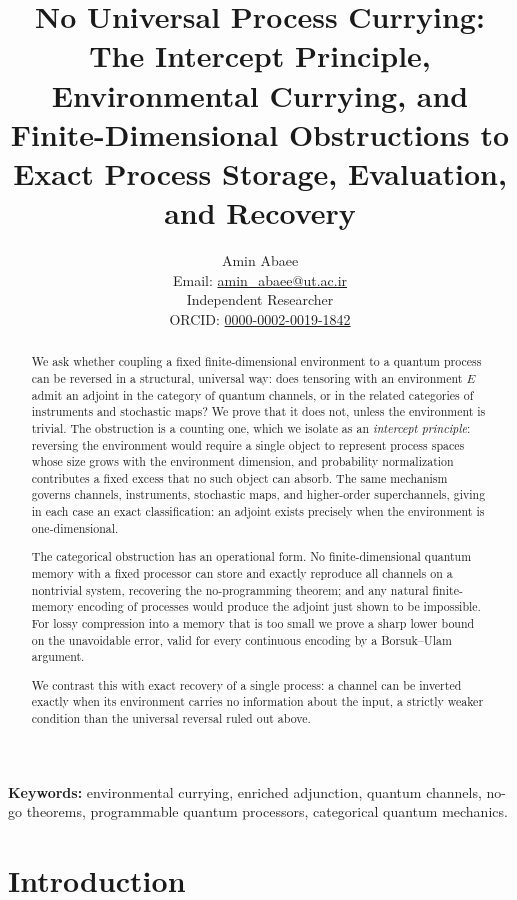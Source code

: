 \documentclass[11pt]{article}
\title{No Universal Process Currying:\\
The Intercept Principle, Environmental Currying, and Finite-Dimensional
Obstructions to Exact Process Storage, Evaluation, and Recovery}
\author{Amin Abaee\\
Email: \href{mailto:amin_abaee@ut.ac.ir}{amin\_abaee@ut.ac.ir}\\
Independent Researcher\\
ORCID: \href{https://orcid.org/0000-0002-0019-1842}{0000-0002-0019-1842}}
\begin{document}
\maketitle

\begin{abstract}
We ask whether coupling a fixed finite-dimensional environment to a quantum
process can be reversed in a structural, universal way: does tensoring with an
environment $E$ admit an adjoint in the category of quantum channels, or in the
related categories of instruments and stochastic maps? We prove that it does
not, unless the environment is trivial. The obstruction is a counting one, which
we isolate as an \emph{intercept principle}: reversing the environment would
require a single object to represent process spaces whose size grows with the
environment dimension, and probability normalization contributes a fixed excess
that no such object can absorb. The same mechanism governs channels,
instruments, stochastic maps, and higher-order superchannels, giving in each
case an exact classification: an adjoint exists precisely when the environment
is one-dimensional.

The categorical obstruction has an operational form. No finite-dimensional
quantum memory with a fixed processor can store and exactly reproduce all
channels on a nontrivial system, recovering the no-programming theorem; and any
natural finite-memory encoding of processes would produce the adjoint just shown
to be impossible. For lossy compression into a memory that is too small we prove
a sharp lower bound on the unavoidable error, valid for every continuous
encoding by a Borsuk--Ulam argument.

We contrast this with exact recovery of a single process: a channel can be
inverted exactly when its environment carries no information about the input, a
strictly weaker condition than the universal reversal ruled out above.
\end{abstract}

\noindent\textbf{Keywords:} environmental currying, enriched adjunction,
quantum channels, no-go theorems, programmable quantum processors,
categorical quantum mechanics.

\section{Introduction}
\label{sec:intro}
\end{document}
